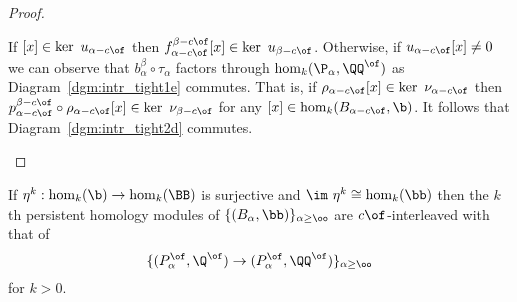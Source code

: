 \begin{proof}
\begin{enumerate}[label=\Roman*.]
    If $[x]\in\ker~u_{\alpha-c\of}$ then $f_{\alpha - c\of}^{\beta-c\of}[x]\in\ker~u_{\beta-c\of}$.
    Otherwise, if $u_{\alpha-c\of}[x]\neq 0$ we can observe that $b_\alpha^\beta\circ\tau_\alpha$ factors through $\hom_k(\P_\alpha, \QQ^\of)$ as Diagram~\ref{dgm:intr_tight1e} commutes.
    That is, if $\rho_{\alpha -c\of}[x]\in\ker~\nu_{\alpha-c\of}$ then $p_{\alpha-c\of}^{\beta-c\of}\circ\rho_{\alpha-c\of}[x]\in\ker~\nu_{\beta-c\of}$ for any $[x]\in \hom_k(B_{\alpha-c\of}, \b)$.
    It follows that Diagram~\ref{dgm:intr_tight2d} commutes.
  \end{enumerate}
\end{proof}

\begin{corollary}\label{cor:geo_inter}
  If $\eta^k : \hom_k(\b)\to \hom_k(\BB)$ is surjective and $\im~\eta^k\cong \hom_k(\bb)$ then the $k$th persistent homology modules of
  $\{(B_\alpha, \bb)\}_{\alpha\geq\oo}$ are $c\of$-interleaved with that of
  \[\{(P_\alpha^\of, \Q^\of)\to (P_\alpha^\of, \QQ^\of)\}_{\alpha\geq\oo}\]
  for $k > 0$.
\end{corollary}
